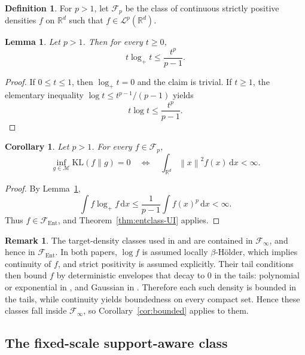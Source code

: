 \documentclass[11pt]{article}
\newtheorem{lemma}[theorem]{Lemma}
\newtheorem{corollary}[theorem]{Corollary}
\theoremstyle{definition}
\newtheorem{definition}[theorem]{Definition}
\newtheorem{remark}[theorem]{Remark}
\begin{document}
\begin{definition}
For $p>1$, let $\mathcal F_p$ be the class of continuous strictly positive densities $f$ on $\mathbb{R}^d$ such that $f\in \mathcal L^p(\mathbb{R}^d)$.
\end{definition}

\begin{lemma}
\label{lem:plogp}
Let $p>1$. Then for every $t\ge0$,
\[
t\log_+ t\le \frac{t^p}{p-1}.
\]
\end{lemma}

\begin{proof}
If $0\le t\le1$, then $\log_+ t=0$ and the claim is trivial. If $t\ge1$, the elementary inequality $\log t\le t^{p-1}/(p-1)$ yields
\[
t\log t\le \frac{t^p}{p-1}.
\]
\end{proof}

\begin{corollary} 
\label{cor:Lp}
Let $p>1$. For every $f\in\mathcal F_p$,
\[
\inf_{g\in\mathcal M}\mathrm{KL}(f\|g)=0
\quad\Longleftrightarrow\quad
\int_{\mathbb{R}^d}\left\lVert x \right\rVert^2f(x)\,\mathrm{d}x<\infty.
\]
\end{corollary}

\begin{proof}
By Lemma~\ref{lem:plogp},
\[
\int f\log_+f\,\mathrm{d}x\le \frac{1}{p-1}\int f(x)^p\,\mathrm{d}x<\infty.
\]
Thus $f\in\mathcal F_{\mathrm{Ent}}$, and Theorem~\ref{thm:entclass-UI} applies.
\end{proof}

\begin{remark}\label{rem:rateclasses}
The target-density classes used in \citet[Theorem~1]{KruijerRousseauvdV2010} and \citet[Definition~2.1]{MaugisRabusseauMichel2013} are contained in $\mathcal F_{\infty}$, and hence in $\mathcal F_{\mathrm{Ent}}$. In both papers, $\log f$ is assumed locally $\beta$-H\"older, which implies continuity of $f$, and strict positivity is assumed explicitly. Their tail conditions then bound $f$ by deterministic envelopes that decay to $0$ in the tails: polynomial or exponential in \citet{KruijerRousseauvdV2010}, and Gaussian in \citet{MaugisRabusseauMichel2013}. Therefore each such density is bounded in the tails, while continuity yields boundedness on every compact set. Hence these classes fall inside $\mathcal F_{\infty}$, so Corollary~\ref{cor:bounded} applies to them.
\end{remark}

\subsection{The fixed-scale support-aware class}
\end{document}
